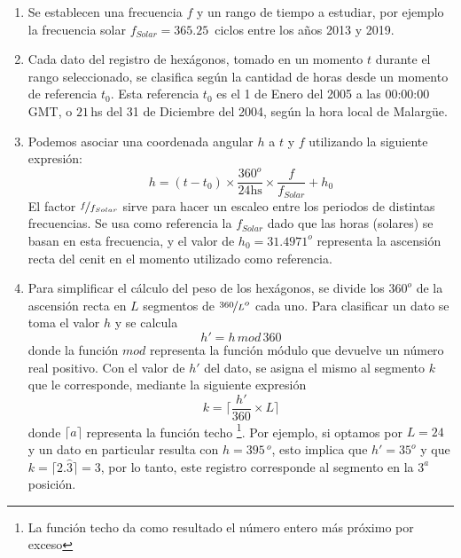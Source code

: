       \begin{enumerate}
        \item Se establecen una frecuencia $f$  y un rango de tiempo a estudiar, por ejemplo la frecuencia solar $f_{Solar}= 365.25\,$ ciclos entre los años 2013 y 2019. 

        \item Cada dato del registro de hexágonos, tomado en un momento $t$ durante el rango seleccionado, se clasifica según la cantidad de horas desde un momento de referencia $t_0$. Esta referencia $t_0$ es el 1 de Enero del 2005 a las 00:00:00 GMT, o  $21\,$hs del 31 de Diciembre del 2004, según la hora local de Malargüe.

        \item Podemos asociar una coordenada angular $h$ a $t$  y $f$  utilizando la siguiente expresión:
         \begin{equation}
          h = (t-t_0) \times \frac{360^o}{24\text{hs}} \times\frac{f}{f_{Solar}} + h_0
          \label{eq:h_horas} 
        \end{equation}
        El factor $\nicefrac{f}{f_{Solar}}$ sirve para hacer un escaleo entre los periodos de distintas frecuencias. Se usa como referencia la $f_{Solar}$ dado que las horas (solares) se basan en esta frecuencia, y el valor de $h_0=31.4971^o$ representa la ascensión recta del cenit en el momento utilizado como referencia.
        
        \item  Para simplificar el cálculo del peso de los hexágonos, se divide los $360^o$ de la ascensión recta en $L$ segmentos de $\nicefrac{360}{L} ^o$ cada uno. Para clasificar un dato se  toma  el valor $h$  y se calcula
        \begin{equation}
          h' = h\, mod \,360 %
          \label{eq:h_primado}
        \end{equation}
        donde la función $mod$ representa la función módulo que devuelve un número real positivo. Con el valor de $h'$ del dato, se asigna el mismo al segmento $k$ que le corresponde, mediante la siguiente expresión
        \begin{equation}
          k = \bigg \lceil \frac{h'}{360}\times L \bigg \rceil
        \end{equation}
        donde $\lceil a \rceil$ representa la función techo \footnote{La función techo da como resultado el número entero más próximo por exceso}. Por ejemplo, si optamos por $L=24$ y un dato en particular resulta con  $h=395\,^o$, esto implica que $h'= 35^o$ y que $k=\lceil 2.\hat{3} \rceil=3$, por lo tanto, este registro corresponde al segmento en la $3^{a}$ posición.


\end{enumerate}
